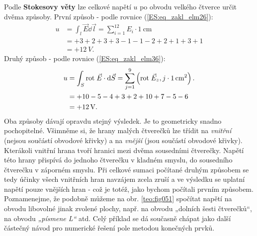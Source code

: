 \begin{mdframed}[style=mdexam]
\begin{example}
  Podle \textbf{Stokesovy věty} lze celkové napětí \(u\) po obvodu velkého čtverce určit dvěma 
  způsoby. První způsob - podle rovnice (\ref{ES:eq_zakl_elm26}):
  \begin{align*}
    u &= \int_l\vec{E}\dd{\vec{l}} = \sum\limits_{i=1}^{12}E_i\cdot\SI{1}{\cm}     \\
      &= +3 +2 +3 +3 - 1 - 1 -2 + 2 + 1 + 3 + 1                                \\
      &= + \SI{12}{V}.
  \end{align*}
  Druhý způsob - podle rovnice (\ref{ES:eq_zakl_elm36}):
  \begin{align*}
    u &= \int_S\rot{E} \cdot \dd{\vec{S}} 
       = \sum\limits_{j=1}^{9}\left(\rot{E}_z,j\cdot\SI{1}{\cm^2}\right).      \\
      &= + 10 - 5 - 4 + 3 + 2 + 10 + 7 - 5 - 6                                 \\
      &= + \SI{12}{V}. 
  \end{align*}
  Oba způsoby dávají opravdu stejný výsledek. Je to geometricky snadno pochopitelné. Všimněme 
  si, že hrany malých čtverečků lze třídit na \emph{vnitřní} (nejsou součástí obvodové křivky) a na 
  \emph{vnější} (jsou součástí obvodové křivky). Kterákoli vnitřní hrana tvoří hranici mezi dvěma 
  sousedními čtverečky. Napětí této hrany přispívá do jednoho čtverečku v kladném smyslu, do 
  sousedního čtverečku v záporném smyslu. Při celkové sumaci počítané druhým způsobem se tedy 
  účinky všech vnitřních hran navzájem zcela zruší a ve výsledku se uplatní napětí pouze vnějších 
  hran - což je totéž, jako bychom počítali prvním způsobem. Poznamenejme, že podobně můžeme na 
  obr. \ref{teo:fig051} spočítat napětí na obvodu libovolné jinak zvolené plochy, 
  např. na obvodu „dolních šesti čtverečků“, na obvodu \emph{„písmene L“} atd. Celý příklad se dá 
  současně chápat jako další částečný návod pro numerické řešení pole metodou konečných prvků.
\end{example}
\end{mdframed}